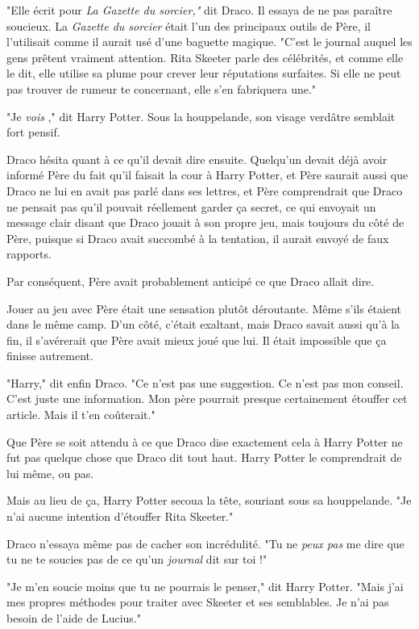 "Elle écrit pour \emph{La Gazette du sorcier," } dit Draco. Il essaya de ne pas paraître soucieux. La \emph{Gazette du sorcier}  était l'un des principaux outils de Père, il l'utilisait comme il aurait usé d'une baguette magique. "C'est le journal auquel les gens prêtent vraiment attention. Rita Skeeter parle des célébrités, et comme elle le dit, elle utilise sa plume pour crever leur réputations surfaites. Si elle ne peut pas trouver de rumeur te concernant, elle s'en fabriquera une."

"Je \emph{vois} ," dit Harry Potter. Sous la houppelande, son visage verdâtre semblait fort pensif.

Draco hésita quant à ce qu'il devait dire ensuite. Quelqu'un devait déjà avoir informé Père du fait qu'il faisait la cour à Harry Potter, et Père saurait aussi que Draco ne lui en avait pas parlé dans ses lettres, et Père comprendrait que Draco ne pensait pas qu'il pouvait réellement garder ça secret, ce qui envoyait un message clair disant que Draco jouait à son propre jeu, mais toujours du côté de Père, puisque si Draco avait succombé à la tentation, il aurait envoyé de faux rapports.

Par conséquent, Père avait probablement anticipé ce que Draco allait dire.

Jouer au jeu avec Père était une sensation plutôt déroutante. Même s'ils étaient dans le même camp. D'un côté, c'était exaltant, mais Draco savait aussi qu'à la fin, il s'avérerait que Père avait mieux joué que lui. Il était impossible que ça finisse autrement.

"Harry," dit enfin Draco. "Ce n'est pas une suggestion. Ce n'est pas mon conseil. C'est juste une information. Mon père pourrait presque certainement étouffer cet article. Mais il t'en coûterait."

Que Père se soit attendu à ce que Draco dise exactement cela à Harry Potter ne fut pas quelque chose que Draco dit tout haut. Harry Potter le comprendrait de lui même, ou pas.

Mais au lieu de ça, Harry Potter secoua la tête, souriant sous sa houppelande. "Je n'ai aucune intention d'étouffer Rita Skeeter."

Draco n'essaya même pas de cacher son incrédulité. "Tu ne \emph{peux pas}  me dire que tu ne te soucies pas de ce qu'un \emph{journal}  dit sur toi !"

"Je m'en soucie moins que tu ne pourrais le penser," dit Harry Potter. "Mais j'ai mes propres méthodes pour traiter avec Skeeter et ses semblables. Je n'ai pas besoin de l'aide de Lucius."

